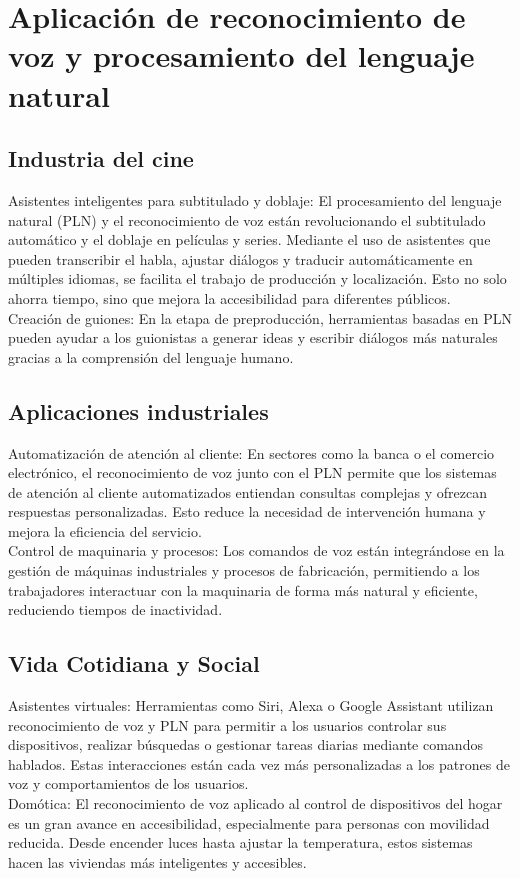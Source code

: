 \documentclass[12pt]{article}
\begin{document}
\section{Aplicación de reconocimiento de voz y procesamiento del lenguaje natural}

\subsection{Industria del cine}

Asistentes inteligentes para subtitulado y doblaje: El procesamiento del lenguaje natural (PLN) y el reconocimiento de voz están revolucionando el subtitulado automático y el doblaje en películas y series. 
Mediante el uso de asistentes que pueden transcribir el habla, ajustar diálogos y traducir automáticamente en múltiples idiomas, se facilita el trabajo de producción y localización. Esto no solo ahorra tiempo, 
sino que mejora la accesibilidad para diferentes públicos.
\\
Creación de guiones: En la etapa de preproducción, herramientas basadas en PLN pueden ayudar a los guionistas a generar ideas y escribir diálogos más naturales gracias a la comprensión del lenguaje humano.

\subsection{Aplicaciones industriales}

Automatización de atención al cliente: En sectores como la banca o el comercio electrónico, el reconocimiento de voz junto con el PLN permite que los sistemas de atención
al cliente automatizados entiendan consultas complejas y ofrezcan respuestas personalizadas. Esto reduce la necesidad de intervención humana y mejora la eficiencia del servicio.
\\
Control de maquinaria y procesos: Los comandos de voz están integrándose en la gestión de máquinas industriales y procesos de fabricación, permitiendo a los trabajadores interactuar con
la maquinaria de forma más natural y eficiente, reduciendo tiempos de inactividad.

\subsection{Vida Cotidiana y Social}

Asistentes virtuales: Herramientas como Siri, Alexa o Google Assistant utilizan reconocimiento de voz y PLN para permitir a los usuarios controlar sus dispositivos, 
realizar búsquedas o gestionar tareas diarias mediante comandos hablados. Estas interacciones están cada vez más personalizadas a los patrones de voz y comportamientos de los usuarios.
\\
Domótica: El reconocimiento de voz aplicado al control de dispositivos del hogar es un gran avance en accesibilidad, especialmente para personas con movilidad reducida. 
Desde encender luces hasta ajustar la temperatura, estos sistemas hacen las viviendas más inteligentes y accesibles.
\end{document}
